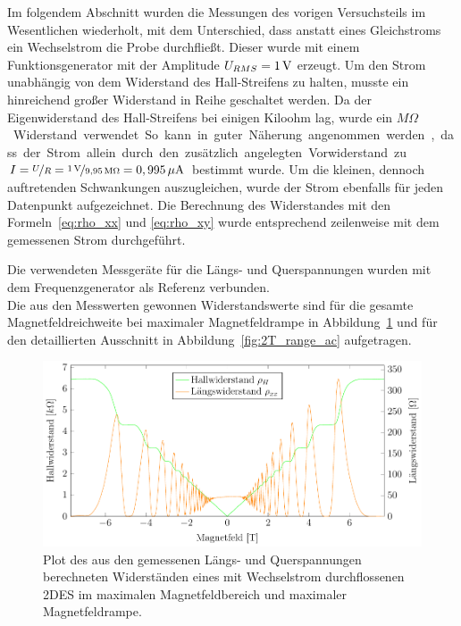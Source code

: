 
Im folgendem Abschnitt wurden die Messungen des vorigen Versuchsteils im Wesentlichen wiederholt, mit dem Unterschied, dass anstatt eines Gleichstroms ein Wechselstrom die Probe durchfließt. 
Dieser wurde mit einem Funktionsgenerator mit der Amplitude $U_{RMS}=\unit[1]{V}$ erzeugt. Um den Strom unabhängig von dem Widerstand des Hall-Streifens zu halten, musste ein hinreichend großer Widerstand in Reihe geschaltet werden. Da der Eigenwiderstand des Hall-Streifens bei einigen Kiloohm lag, wurde ein \unit[9,95]{$M\Omega$} Widerstand verwendet. So kann in guter Näherung angenommen werden, dass der Strom allein durch den zusätzlich angelegten Vorwiderstand zu $I=\nicefrac{U}{R}=\nicefrac{\unit[1]{V}}{\unit[9,95]{M\Omega}}=\unit[0,995]{\mu A}$ bestimmt wurde. Um die kleinen, dennoch auftretenden Schwankungen auszugleichen, wurde der Strom ebenfalls für jeden Datenpunkt aufgezeichnet. Die Berechnung des Widerstandes mit den Formeln~\eqref{eq:rho_xx} und \eqref{eq:rho_xy} wurde entsprechend zeilenweise mit dem gemessenen Strom durchgeführt.

Die verwendeten Messgeräte für die Längs- und Querspannungen wurden mit dem Frequenzgenerator als Referenz verbunden. %
\\

Die aus den Messwerten gewonnen Widerstandswerte sind für die gesamte Magnetfeldreichweite bei maximaler Magnetfeldrampe in Abbildung~\ref{fig:full_range_ac} und für den detaillierten Ausschnitt in Abbildung~\ref{fig:2T_range_ac} aufgetragen.

\begin{figure}[h]
	\centering
	\includegraphics{graphs/ac/full_range.pdf}
	\caption[Wechselstrommessung im maximalen Magnetfeldbereich]{
		Plot des aus den gemessenen Längs- und Querspannungen berechneten Widerständen eines mit Wechselstrom durchflossenen 2DES im maximalen Magnetfeldbereich und maximaler Magnetfeldrampe.
	}
	\label{fig:full_range_ac}
\end{figure}

